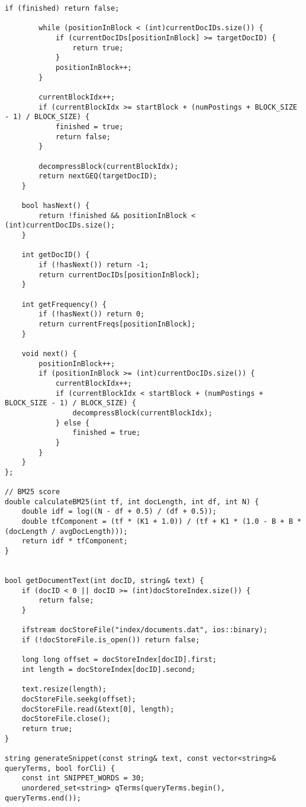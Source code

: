 \documentclass{article}
\begin{document}
\begin{lstlisting}[caption={The complete source code for the query processor component.}, label={lst:query}]
        if (finished) return false;
        
        while (positionInBlock < (int)currentDocIDs.size()) {
            if (currentDocIDs[positionInBlock] >= targetDocID) {
                return true;
            }
            positionInBlock++;
        }
        
        currentBlockIdx++;
        if (currentBlockIdx >= startBlock + (numPostings + BLOCK_SIZE - 1) / BLOCK_SIZE) {
            finished = true;
            return false;
        }
        
        decompressBlock(currentBlockIdx);
        return nextGEQ(targetDocID);
    }
    
    bool hasNext() {
        return !finished && positionInBlock < (int)currentDocIDs.size();
    }
    
    int getDocID() {
        if (!hasNext()) return -1;
        return currentDocIDs[positionInBlock];
    }
    
    int getFrequency() {
        if (!hasNext()) return 0;
        return currentFreqs[positionInBlock];
    }
    
    void next() {
        positionInBlock++;
        if (positionInBlock >= (int)currentDocIDs.size()) {
            currentBlockIdx++;
            if (currentBlockIdx < startBlock + (numPostings + BLOCK_SIZE - 1) / BLOCK_SIZE) {
                decompressBlock(currentBlockIdx);
            } else {
                finished = true;
            }
        }
    }
};

// BM25 score
double calculateBM25(int tf, int docLength, int df, int N) {
    double idf = log((N - df + 0.5) / (df + 0.5));
    double tfComponent = (tf * (K1 + 1.0)) / (tf + K1 * (1.0 - B + B * (docLength / avgDocLength)));
    return idf * tfComponent;
}


bool getDocumentText(int docID, string& text) {
    if (docID < 0 || docID >= (int)docStoreIndex.size()) {
        return false;
    }

    ifstream docStoreFile("index/documents.dat", ios::binary);
    if (!docStoreFile.is_open()) return false;

    long long offset = docStoreIndex[docID].first;
    int length = docStoreIndex[docID].second;

    text.resize(length);
    docStoreFile.seekg(offset);
    docStoreFile.read(&text[0], length);
    docStoreFile.close();
    return true;
}

string generateSnippet(const string& text, const vector<string>& queryTerms, bool forCli) {
    const int SNIPPET_WORDS = 30;
    unordered_set<string> qTerms(queryTerms.begin(), queryTerms.end());


\end{lstlisting}
\end{document}
